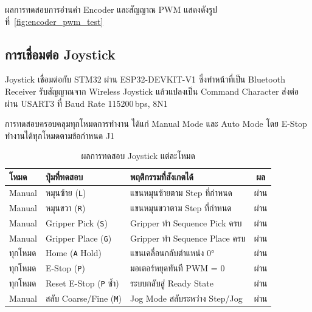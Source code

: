 ผลการทดสอบการอ่านค่า Encoder และสัญญาณ PWM
แสดงดังรูปที่~\ref{fig:encoder_pwm_test}


\subsection{การเชื่อมต่อ Joystick}
\label{subsec:joystick_connection}

Joystick เชื่อมต่อกับ STM32 ผ่าน ESP32-DEVKIT-V1
ซึ่งทำหน้าที่เป็น Bluetooth Receiver
รับสัญญาณจาก Wireless Joystick แล้วแปลงเป็น
Command Character ส่งต่อผ่าน USART3
ที่ Baud Rate 115200\,bps, 8N1

การทดสอบครอบคลุมทุกโหมดการทำงาน
ได้แก่ Manual Mode และ Auto Mode
โดย E-Stop ทำงานได้ทุกโหมดตามข้อกำหนด J1

\begin{table}[H]
  \centering
  \caption{ผลการทดสอบ Joystick แต่ละโหมด}
  \label{tab:joystick_test}
  \begin{tabular}{lllc}
    \toprule
    โหมด & ปุ่มที่ทดสอบ & พฤติกรรมที่สังเกตได้ & ผล \\
    \midrule
    Manual
      & หมุนซ้าย (\texttt{L})
      & แขนหมุนซ้ายตาม Step ที่กำหนด
      & ผ่าน \\
    Manual
      & หมุนขวา (\texttt{R})
      & แขนหมุนขวาตาม Step ที่กำหนด
      & ผ่าน \\
    Manual
      & Gripper Pick (\texttt{S})
      & Gripper ทำ Sequence Pick ครบ
      & ผ่าน \\
    Manual
      & Gripper Place (\texttt{G})
      & Gripper ทำ Sequence Place ครบ
      & ผ่าน \\
    ทุกโหมด
      & Home (\texttt{A} Hold)
      & แขนเคลื่อนกลับตำแหน่ง 0°
      & ผ่าน \\
    ทุกโหมด
      & E-Stop (\texttt{P})
      & มอเตอร์หยุดทันที PWM = 0
      & ผ่าน \\
    ทุกโหมด
      & Reset E-Stop (\texttt{P} ซ้ำ)
      & ระบบกลับสู่ Ready State
      & ผ่าน \\
    Manual
      & สลับ Coarse/Fine (\texttt{M})
      & Jog Mode สลับระหว่าง Step/Jog
      & ผ่าน \\
    \bottomrule
  \end{tabular}
\end{table}

